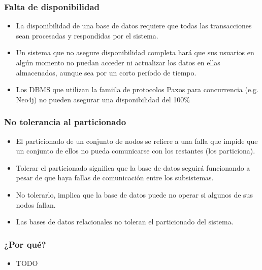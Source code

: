 \begin{frame}
\frametitle{Falta de disponibilidad}
\begin{itemize}

	\item	La disponibilidad de una base de datos requiere que todas las transacciones sean procesadas y respondidas por el sistema. \pause
	\item	Un sistema que no asegure disponibilidad completa hará que sus usuarios en algún momento no puedan acceder ni actualizar los datos en ellas almacenados, aunque sea por un corto período de tiempo.
	\item	Los DBMS que utilizan la famiila de protocolos Paxos para concurrencia (e.g. Neo4j) no pueden asegurar una disponibilidad del 100\%

\end{itemize}
\end{frame}

\begin{frame}
\frametitle{No tolerancia al particionado}
\begin{itemize}

	\item	El particionado de un conjunto de nodos se refiere a una falla que impide que un conjunto de ellos no pueda comunicarse con los restantes (los particiona). \pause
	\item	Tolerar el particionado significa que la base de datos seguirá funcionando a pesar de que haya fallas de comunicación entre los subsistemas. \pause
	\item	No tolerarlo, implica que la base de datos puede no operar si algunos de sus nodos fallan. \pause
	\item	Las bases de datos relacionales no toleran el particionado del sistema.
	
\end{itemize}
\end{frame}

\begin{frame}
\frametitle{¿Por qué?}
\begin{itemize}

	\item TODO
\end{itemize}
\end{frame}
